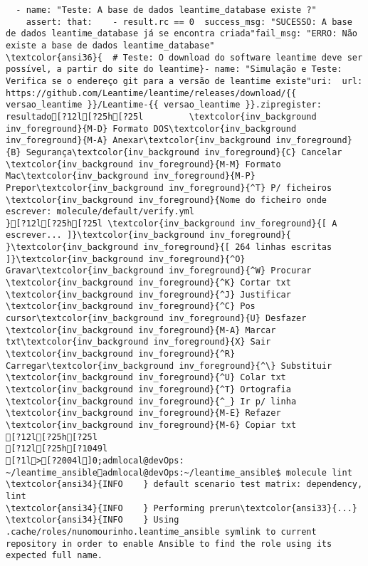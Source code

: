 \documentclass{scrartcl}
\begin{document}
\begin{Verbatim}
  - name: "Teste: A base de dados leantime_database existe ?"
    assert: that:    - result.rc == 0  success_msg: "SUCESSO: A base de dados leantime_database já se encontra criada"fail_msg: "ERRO: Não existe a base de dados leantime_database"
\textcolor{ansi36}{  # Teste: O download do software leantime deve ser possível, a partir do site do leantime}- name: "Simulação e Teste: Verifica se o endereço git para a versão de leantime existe"uri:  url: https://github.com/Leantime/leantime/releases/download/{{ versao_leantime }}/Leantime-{{ versao_leantime }}.zipregister: resultado[?12l[?25h[?25l         \textcolor{inv_background inv_foreground}{M-D} Formato DOS\textcolor{inv_background inv_foreground}{M-A} Anexar\textcolor{inv_background inv_foreground}{B} Segurança\textcolor{inv_background inv_foreground}{C} Cancelar           \textcolor{inv_background inv_foreground}{M-M} Formato Mac\textcolor{inv_background inv_foreground}{M-P} Prepor\textcolor{inv_background inv_foreground}{^T} P/ ficheiros
\textcolor{inv_background inv_foreground}{Nome do ficheiro onde escrever: molecule/default/verify.yml                                                                               }[?12l[?25h[?25l \textcolor{inv_background inv_foreground}{[ A escrever... ]}\textcolor{inv_background inv_foreground}{          }\textcolor{inv_background inv_foreground}{[ 264 linhas escritas ]}\textcolor{inv_background inv_foreground}{^O} Gravar\textcolor{inv_background inv_foreground}{^W} Procurar      \textcolor{inv_background inv_foreground}{^K} Cortar txt    \textcolor{inv_background inv_foreground}{^J} Justificar    \textcolor{inv_background inv_foreground}{^C} Pos cursor\textcolor{inv_background inv_foreground}{U} Desfazer     \textcolor{inv_background inv_foreground}{M-A} Marcar txt\textcolor{inv_background inv_foreground}{X} Sair    \textcolor{inv_background inv_foreground}{^R} Carregar\textcolor{inv_background inv_foreground}{^\} Substituir    \textcolor{inv_background inv_foreground}{^U} Colar txt     \textcolor{inv_background inv_foreground}{^T} Ortografia    \textcolor{inv_background inv_foreground}{^_} Ir p/ linha   \textcolor{inv_background inv_foreground}{M-E} Refazer      \textcolor{inv_background inv_foreground}{M-6} Copiar txt
[?12l[?25h[?25l
[?12l[?25h[?1049l
[?1l>[?2004l]0;admlocal@devOps: ~/leantime_ansibleadmlocal@devOps:~/leantime_ansible$ molecule lint
\textcolor{ansi34}{INFO    } default scenario test matrix: dependency, lint
\textcolor{ansi34}{INFO    } Performing prerun\textcolor{ansi33}{...}
\textcolor{ansi34}{INFO    } Using .cache/roles/nunomourinho.leantime_ansible symlink to current repository in order to enable Ansible to find the role using its expected full name.

\end{Verbatim}
\end{document}

